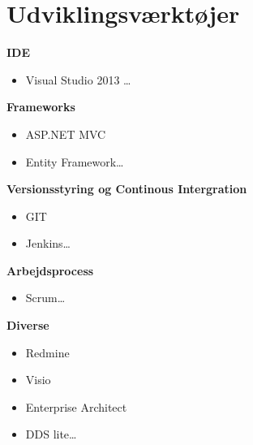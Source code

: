 \chapter{Udviklingsværktøjer} 


\textbf{IDE}
\begin{itemize}
  \item Visual Studio 2013 \ldots
\end{itemize}



\textbf{Frameworks} 
\begin{itemize}
  \item ASP.NET MVC
  \item Entity Framework\ldots
\end{itemize}

\textbf{Versionsstyring og Continous Intergration} 
\begin{itemize}
  \item GIT
  \item Jenkins\ldots
\end{itemize}

\textbf{Arbejdsprocess} 
\begin{itemize}
  \item Scrum\ldots
\end{itemize}

\textbf{Diverse} 
\begin{itemize}
  \item Redmine
  \item Visio
  \item Enterprise Architect
  \item DDS lite\ldots
\end{itemize}